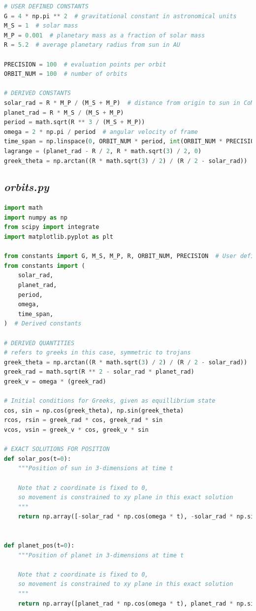 \documentclass[11pt, a4paper,twocolumn]{article} %
\begin{document}
\begin{appendices}
\begin{lstlisting}[language=Python]
# USER DEFINED CONSTANTS
G = 4 * np.pi ** 2  # gravitational constant in astronomical units
M_S = 1  # solar mass
M_P = 0.001  # planetary mass as a fraction of solar mass
R = 5.2  # average planetary radius from sun in AU

PRECISION = 100  # evaluation points per orbit
ORBIT_NUM = 100  # number of orbits

# DERIVED CONSTANTS
solar_rad = R * M_P / (M_S + M_P)  # distance from origin to sun in CoM frame
planet_rad = R * M_S / (M_S + M_P)
period = math.sqrt(R ** 3 / (M_S + M_P))
omega = 2 * np.pi / period  # angular velocity of frame
time_span = np.linspace(0, ORBIT_NUM * period, int(ORBIT_NUM * PRECISION))
lagrange = (planet_rad - R / 2, R * math.sqrt(3) / 2, 0)
greek_theta = np.arctan((R * math.sqrt(3) / 2) / (R / 2 - solar_rad))
\end{lstlisting}

\bigskip
\subsection{\textit{orbits.py}}
\begin{lstlisting}[language=Python]
import math
import numpy as np
from scipy import integrate
import matplotlib.pyplot as plt

from constants import G, M_S, M_P, R, ORBIT_NUM, PRECISION  # User defined constants
from constants import (
	solar_rad,
	planet_rad,
	period,
	omega,
	time_span,
)  # Derived constants

# DERIVED QUANTITIES
# refers to greeks in this case, symmetric to trojans
greek_theta = np.arctan((R * math.sqrt(3) / 2) / (R / 2 - solar_rad))
greek_rad = math.sqrt(R ** 2 - solar_rad * planet_rad)
greek_v = omega * (greek_rad)

# Initial conditions for Greeks, given as equillibrium state 
cos, sin = np.cos(greek_theta), np.sin(greek_theta)
rcos, rsin = greek_rad * cos, greek_rad * sin
vcos, vsin = greek_v * cos, greek_v * sin

# EXACT SOLUTIONS FOR POSITION
def solar_pos(t=0):
	"""Position of sun in 3-dimensions at time t
	
	Note that z coordinate is fixed to 0, 
	so movement is constrained to xy plane in this exact solution
	"""
	return np.array([-solar_rad * np.cos(omega * t), -solar_rad * np.sin(omega * t), 0])


def planet_pos(t=0):
	"""Position of planet in 3-dimensions at time t
	
	Note that z coordinate is fixed to 0, 
	so movement is constrained to xy plane in this exact solution
	"""
	return np.array([planet_rad * np.cos(omega * t), planet_rad * np.sin(omega * t), 0])



\end{lstlisting}
\end{appendices}
\end{document}
